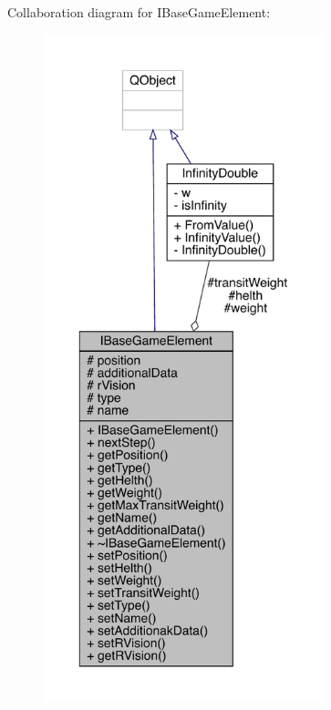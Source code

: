 Collaboration diagram for I\+Base\+Game\+Element\+:
\nopagebreak
\begin{figure}[H]
\begin{center}
\leavevmode
\includegraphics[height=550pt]{d5/d5b/a00135}
\end{center}
\end{figure}
